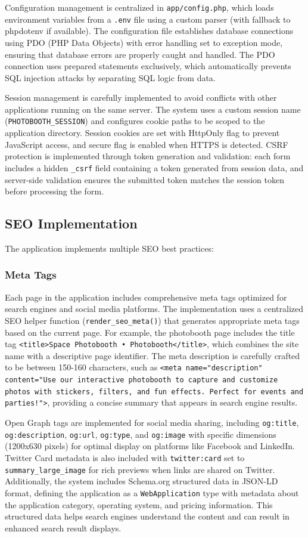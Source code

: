 \documentclass[12pt,a4paper]{article}
\begin{document}
Configuration management is centralized in \texttt{app/config.php}, which loads environment variables from a \texttt{.env} file using a custom parser (with fallback to phpdotenv if available). The configuration file establishes database connections using PDO (PHP Data Objects) with error handling set to exception mode, ensuring that database errors are properly caught and handled. The PDO connection uses prepared statements exclusively, which automatically prevents SQL injection attacks by separating SQL logic from data.

Session management is carefully implemented to avoid conflicts with other applications running on the same server. The system uses a custom session name (\texttt{PHOTOBOOTH\_SESSION}) and configures cookie paths to be scoped to the application directory. Session cookies are set with HttpOnly flag to prevent JavaScript access, and secure flag is enabled when HTTPS is detected. CSRF protection is implemented through token generation and validation: each form includes a hidden \texttt{\_csrf} field containing a token generated from session data, and server-side validation ensures the submitted token matches the session token before processing the form.

\subsection{SEO Implementation}
The application implements multiple SEO best practices:

\subsubsection{Meta Tags}
Each page in the application includes comprehensive meta tags optimized for search engines and social media platforms. The implementation uses a centralized SEO helper function (\texttt{render\_seo\_meta()}) that generates appropriate meta tags based on the current page. For example, the photobooth page includes the title tag \texttt{<title>Space Photobooth • Photobooth</title>}, which combines the site name with a descriptive page identifier. The meta description is carefully crafted to be between 150-160 characters, such as \texttt{<meta name="description" content="Use our interactive photobooth to capture and customize photos with stickers, filters, and fun effects. Perfect for events and parties!">}, providing a concise summary that appears in search engine results.

Open Graph tags are implemented for social media sharing, including \texttt{og:title}, \texttt{og:description}, \texttt{og:url}, \texttt{og:type}, and \texttt{og:image} with specific dimensions (1200x630 pixels) for optimal display on platforms like Facebook and LinkedIn. Twitter Card metadata is also included with \texttt{twitter:card} set to \texttt{summary\_large\_image} for rich previews when links are shared on Twitter. Additionally, the system includes Schema.org structured data in JSON-LD format, defining the application as a \texttt{WebApplication} type with metadata about the application category, operating system, and pricing information. This structured data helps search engines understand the content and can result in enhanced search result displays.
\end{document}
